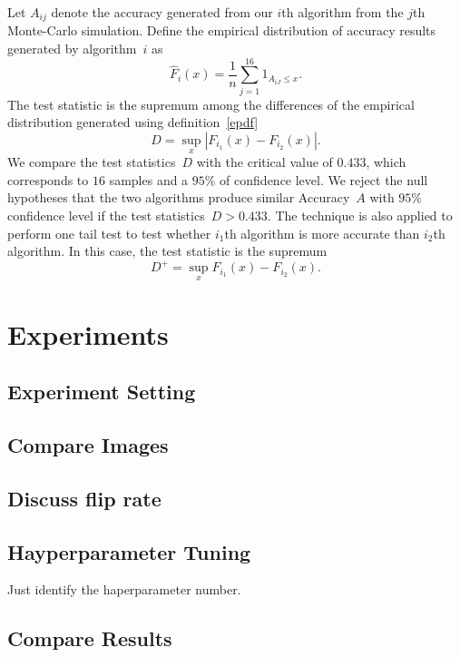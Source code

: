 \documentclass[12pt]{article} %
\begin{document}
Let $A_{ij}$ denote the accuracy generated from our {$i$}th algorithm from the $j$th Monte-Carlo simulation. Define the empirical distribution of accuracy results generated by algorithm~$i$ as
\begin{equation}\label{epdf}
  \hat{F}_{i}(x)=\frac{1}{n}\sum_{j=1}^{16}1_{A_{iJ} \leq x}.
\end{equation}
The test statistic is the supremum among the differences of the empirical distribution generated using definition~\eqref{epdf} \citep{Walck:1996cca}
\begin{equation}\label{teststatistic}
D=\sup _{x}\left|F_{i_1}(x)-F_{i_2}(x)\right|.
\end{equation}
We compare the test statistics~$D$ with the critical value of $0.433$, which corresponds to $16$ samples and a $95\%$ of confidence level. We reject the null hypotheses that the two algorithms produce similar Accuracy~$A$ with $95\%$ confidence level if the test statistics~$D>0.433$. The technique is also applied to perform one tail test to test whether $i_1$th algorithm is more accurate than $i_2$th algorithm. In this case, the test statistic is the supremum
\begin{equation}\label{teststatistic}
D^+=\sup _{x}F_{i_1}(x)-F_{i_2}(x).
\end{equation}
\section{Experiments}\label{result}

\subsection{Experiment Setting}
\subsection{Compare Images}
\subsection{Discuss flip rate}

\subsection{Hayperparameter Tuning}
Just identify the haperparameter number.

\subsection{Compare Results}
\end{document}
